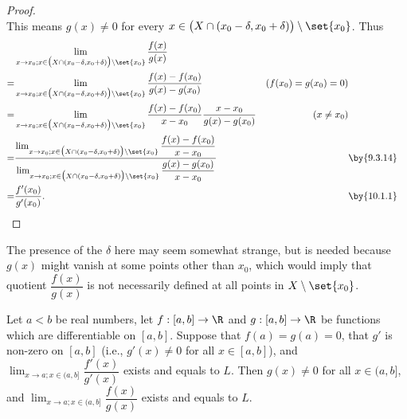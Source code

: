 \begin{proof}
\[  \]
  This means \(g(x) \neq 0\) for every \(x \in \big(X \cap (x_0 - \delta, x_0 + \delta)\big) \setminus \set{x_0}\).
  Thus
  \begin{align*}
      & \lim_{x \to x_0 ; x \in \big(X \cap (x_0 - \delta, x_0 + \delta)\big) \setminus \set{x_0}} \dfrac{f(x)}{g(x)}                                                                                                                                                                                      \\
    = & \lim_{x \to x_0 ; x \in \big(X \cap (x_0 - \delta, x_0 + \delta)\big) \setminus \set{x_0}} \dfrac{f(x) - f(x_0)}{g(x) - g(x_0)}                                                                                                                              & (f(x_0) = g(x_0) = 0)               \\
    = & \lim_{x \to x_0 ; x \in \big(X \cap (x_0 - \delta, x_0 + \delta)\big) \setminus \set{x_0}} \dfrac{f(x) - f(x_0)}{x - x_0} \dfrac{x - x_0}{g(x) - g(x_0)}                                                                                                     & (x \neq x_0)                        \\
    = & \dfrac{\lim_{x \to x_0 ; x \in \big(X \cap (x_0 - \delta, x_0 + \delta)\big) \setminus \set{x_0}} \dfrac{f(x) - f(x_0)}{x - x_0}}{\lim_{x \to x_0 ; x \in \big(X \cap (x_0 - \delta, x_0 + \delta)\big) \setminus \set{x_0}} \dfrac{g(x) - g(x_0)}{x - x_0}} &                       & \by{9.3.14} \\
    = & \dfrac{f'(x_0)}{g'(x_0)}.                                                                                                                                                                                                                                    &                       & \by{10.1.1}
  \end{align*}
\end{proof}

\begin{note}
  The presence of the \(\delta\) here may seem somewhat strange, but is needed because \(g(x)\) might vanish at some points other than \(x_0\), which would imply that quotient \(\dfrac{f(x)}{g(x)}\) is not necessarily defined at all points in \(X \setminus \set{x_0}\).
\end{note}

\begin{prop}\label{10.5.2}
  Let \(a < b\) be real numbers, let \(f : [a, b] \to \R\) and \(g : [a, b] \to \R\) be functions which are differentiable on \([a, b]\).
  Suppose that \(f(a) = g(a) = 0\), that \(g'\) is non-zero on \([a, b]\) (i.e., \(g'(x) \neq 0\) for all \(x \in [a, b]\)), and \(\lim_{x \to a ; x \in (a, b]} \dfrac{f'(x)}{g'(x)}\) exists and equals to \(L\).
  Then \(g(x) \neq 0\) for all \(x \in (a, b]\), and \(\lim_{x \to a ; x \in (a, b]} \dfrac{f(x)}{g(x)}\) exists and equals to \(L\).
\end{prop}

